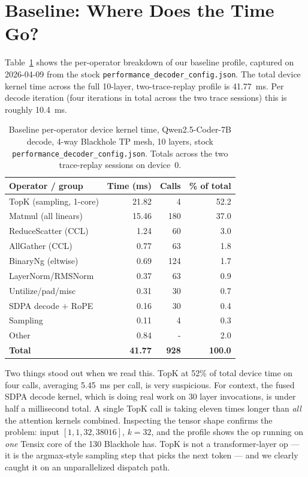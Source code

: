 \documentclass[sigplan,nonacm]{acmart}
\begin{document}
\section{Baseline: Where Does the Time Go?}
\label{sec:baseline}

Table~\ref{tab:baseline} shows the per-operator breakdown of our
baseline profile, captured on 2026-04-09 from the stock
\texttt{performance\_decoder\_config.json}. The total device kernel
time across the full 10-layer, two-trace-replay profile is 41.77~ms.
Per decode iteration (four iterations in total across the two trace
sessions) this is roughly 10.4~ms.

\begin{table}[t]
\centering
\small
\caption{Baseline per-operator device kernel time, Qwen2.5-Coder-7B
decode, 4-way Blackhole TP mesh, 10 layers, stock
\texttt{performance\_decoder\_config.json}. Totals across the two
trace-replay sessions on device~0.}
\label{tab:baseline}
\begin{tabular}{lrrr}
\toprule
Operator / group & Time (ms) & Calls & \% of total \\
\midrule
TopK (sampling, 1-core)    & 21.82 &   4 & 52.2 \\
Matmul (all linears)       & 15.46 & 180 & 37.0 \\
ReduceScatter (CCL)        &  1.24 &  60 &  3.0 \\
AllGather (CCL)            &  0.77 &  63 &  1.8 \\
BinaryNg (eltwise)         &  0.69 & 124 &  1.7 \\
LayerNorm/RMSNorm          &  0.37 &  63 &  0.9 \\
Untilize/pad/misc          &  0.31 &  30 &  0.7 \\
SDPA decode ${+}$ RoPE     &  0.16 &  30 &  0.4 \\
Sampling                   &  0.11 &   4 &  0.3 \\
Other                      &  0.84 &   - &  2.0 \\
\midrule
\textbf{Total}             & \textbf{41.77} & \textbf{928} & \textbf{100.0} \\
\bottomrule
\end{tabular}
\end{table}

Two things stood out when we read this. TopK at 52\% of total
device time on four calls, averaging 5.45~ms per call, is very
suspicious. For context, the fused SDPA decode kernel, which is doing
real work on 30 layer invocations, is under half a millisecond total.
A single TopK call is taking eleven times longer than \emph{all}
the attention kernels combined. Inspecting the tensor shape confirms
the problem: input $[1,1,32,38016]$, $k{=}32$, and the profile shows
the op running on \emph{one} Tensix core of the 130 Blackhole has.
TopK is not a transformer-layer op --- it is the argmax-style
sampling step that picks the next token --- and we clearly caught it
on an unparallelized dispatch path.
\end{document}

